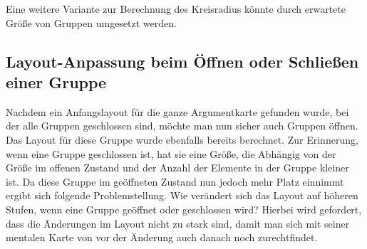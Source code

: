 


Eine weitere Variante zur Berechnung des Kreisradius könnte durch erwartete Größe von Gruppen umgesetzt werden.
		
							



\subsection{Layout-Anpassung beim Öffnen oder Schließen einer Gruppe}
Nachdem ein Anfangslayout für die ganze Argumentkarte gefunden wurde, bei der alle Gruppen geschlossen sind, möchte man nun sicher auch Gruppen öffnen. Das Layout für diese Gruppe wurde ebenfalls bereits berechnet. Zur Erinnerung, wenn eine Gruppe geschlossen ist, hat sie eine Größe, die Abhängig von der Größe im offenen Zustand und der Anzahl der Elemente in der Gruppe kleiner ist. Da diese Gruppe im geöffneten Zustand nun jedoch mehr Platz einnimmt ergibt sich folgende Problemstellung.
Wie verändert sich das Layout auf höheren Stufen, wenn eine Gruppe geöffnet oder geschlossen wird? Hierbei wird gefordert, dass die Änderungen im Layout nicht zu stark sind, damit man sich mit seiner mentalen Karte von vor der Änderung auch danach noch zurechtfindet.

